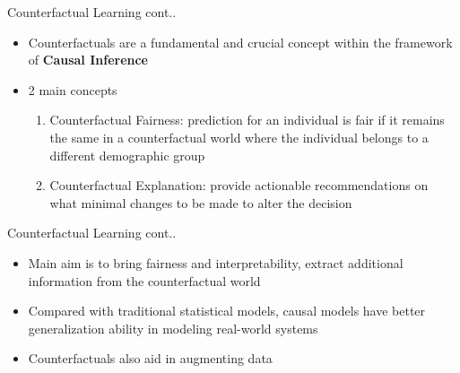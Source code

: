 \documentclass[aspectratio=169,xcolor=dvipsnames]{beamer}
\begin{document}
	\begin{frame}{Counterfactual Learning cont..}
		\begin{itemize}
		\item Counterfactuals are a fundamental and crucial concept within the framework of \textbf{Causal Inference}
		\item 2 main concepts
		\begin{enumerate}
			\item Counterfactual Fairness: prediction for an individual is 			fair if it remains the same in a counterfactual world where the individual belongs to a different demographic	group
			\item Counterfactual Explanation: provide actionable recommendations on what minimal 			changes to be made to alter the decision
		\end{enumerate}
		
		\end{itemize}
	\end{frame}
	\begin{frame}{Counterfactual Learning cont..}
		\begin{itemize}
			\item Main aim is to bring fairness and interpretability, extract additional information from the counterfactual world \cite{p1}
			\item Compared with traditional statistical models, causal 		models have better generalization ability in modeling real-world systems
			\item Counterfactuals also aid in augmenting data \cite{9950302}
		\end{itemize}
	\end{frame}
\end{document}
